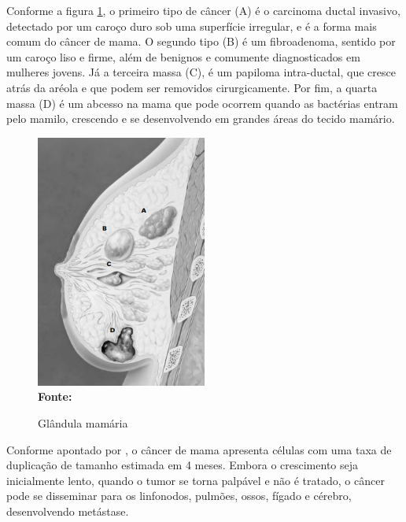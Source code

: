 Conforme a figura \ref{fig:glandulamama}, o primeiro tipo de câncer (A) é o carcinoma ductal invasivo, detectado por um caroço duro sob uma superfície irregular, e é a forma mais comum do câncer de mama. O segundo tipo (B) é um fibroadenoma, sentido por um caroço liso e firme, além de benignos e comumente diagnosticados em mulheres jovens. Já a terceira massa (C), é um papiloma intra-ductal, que cresce atrás da aréola e que podem ser removidos cirurgicamente. Por fim, a quarta massa (D) é um abcesso na mama que pode ocorrem quando as bactérias entram pelo mamilo, crescendo e se desenvolvendo em grandes áreas do tecido mamário.

\begin{figure}[ht]
	\centering	
	\caption[\hspace{0.1cm}Grade Computacional.]{Glândula mamária}
	\vspace{-0.4cm}
	\includegraphics[width=0.5\textwidth]{figuras/mama.PNG}
	 \vspace{-0.2cm}
	\\\textbf{\footnotesize Fonte: \cite{breasCancerBasicsCap4} }
	\label{fig:glandulamama}
\end{figure}
\vspace{-0.5cm}

Conforme apontado por , o câncer de mama apresenta células com uma taxa de duplicação de tamanho estimada em 4 meses. Embora o crescimento seja inicialmente lento, quando o tumor se torna palpável e não é tratado, o câncer pode se disseminar para os linfonodos, pulmões, ossos, fígado e cérebro, desenvolvendo metástase.

